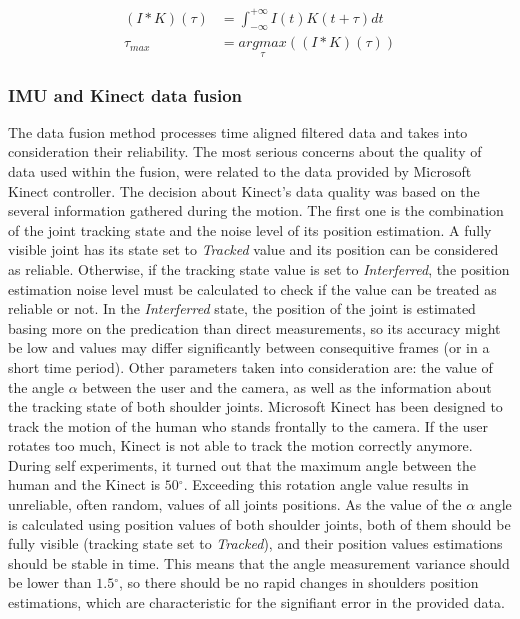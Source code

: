 \documentclass[sensors,article,submit,moreauthors,pdftex,10pt,a4paper]{mdpi}
\newcommand{\degree}{\ensuremath{{}^{\circ}}\xspace}
\begin{document}
	\begin{subequations}
		\begin{align}
			(I \ast K)(\tau) & = \int_{-\infty}^{+\infty}I(t)K(t+\tau)dt\label{eq:cross-cor:1}   \\
			\tau_{max}       & = \underset{\tau}{argmax}((I \ast K)(\tau))\label{eq:cross-cor:2} 
		\end{align}
		\label{eq:cross-cor}
	\end{subequations}
		
		
		
	\subsubsection{IMU and Kinect data fusion}
	The data fusion method processes time aligned filtered data and takes into consideration their reliability. The most serious concerns about the quality of data used within the fusion, were related to the data provided by Microsoft Kinect controller. The decision about Kinect’s data quality was based on the several information gathered during the motion. The first one is the combination of the joint tracking state and the noise level of its position estimation. A fully visible joint has its state set to \emph{Tracked} value and its position can be considered as reliable. Otherwise, if the tracking state value is set to \emph{Interferred}, the position estimation noise level must be calculated to check if the value can be treated as reliable or not. In the \emph{Interferred} state, the position of the joint is estimated basing more on the predication than direct measurements, so its accuracy might be low and values may differ significantly between consequitive frames (or in a short time period). Other parameters taken into consideration are: the value of the angle $\alpha$ between the user and the camera, as well as the information about the tracking state of both shoulder joints. Microsoft Kinect has been designed to track the motion of the human who stands frontally to the camera. If the user rotates too much, Kinect is not able to track the motion correctly anymore. During self experiments, it turned out that the maximum angle between the human and the Kinect is $50\degree$. Exceeding this rotation angle value results in unreliable, often random, values of all joints positions. As the value of the $\alpha$ angle is calculated using position values of both shoulder joints, both of them should be fully visible (tracking state set to \emph{Tracked}), and their position values estimations should be stable in time. This means that the angle measurement variance should be lower than $1.5\degree$, so there should be no rapid changes in shoulders position estimations, which are characteristic for the signifiant error in the provided data. 
		
\end{document}
